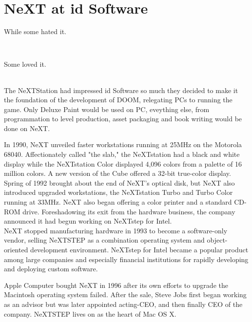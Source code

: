 \section{NeXT at id Software}
While some hated it.\\
\par
{}\\
\par
Some loved it.\\
\par
{}\\
The NeXTStation had impressed id Software so much they decided to make it the foundation of the development of DOOM, relegating PCs to running the game. Only Deluxe Paint would be used on PC, eveything else, from programmation to level production, asset packaging and book writing would be done on NeXT.


\par
In 1990, NeXT unveiled faster workstations running at 25MHz on the Motorola 68040. Affectionately called "the slab," the NeXTstation had a black and white display while the NeXTstation Color displayed 4,096 colors from a palette of 16 million colors. A new version of the Cube offered a 32-bit true-color display.
Spring of 1992 brought about the end of NeXT's optical disk, but NeXT also introduced upgraded workstations, the NeXTstation Turbo and Turbo Color running at 33MHz. NeXT also began offering a color printer and a standard CD-ROM drive. Foreshadowing its exit from the hardware business, the company announced it had begun working on NeXTstep for Intel.\\

NeXT stopped manufacturing hardware in 1993 to become a software-only vendor, selling NeXTSTEP as a combination operating system and object-oriented development environment. NeXTstep for Intel became a popular product among large companies and especially financial institutions for rapidly developing and deploying custom software. \\
\par
Apple Computer bought NeXT in 1996 after its own efforts to upgrade the Macintosh operating system failed.  After the sale, Steve Jobs first began working as an advisor but was later appointed acting-CEO, and then finally CEO of the company.  NeXTSTEP lives on as the heart of Mac OS X.\\



